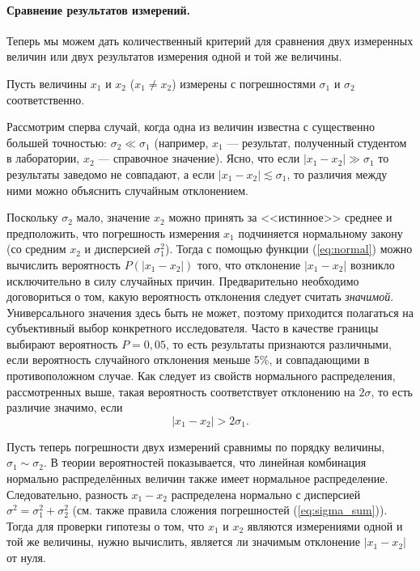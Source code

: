 \documentclass[10pt]{article}
\begin{document}
\paragraph{Сравнение результатов измерений.}

Теперь мы можем дать количественный критерий для сравнения двух измеренных
величин или двух результатов измерения одной и той же величины.

Пусть величины $x_{1}$ и $x_{2}$ ($x_{1}\ne x_{2}$) измерены с
погрешностями $\sigma_{1}$ и $\sigma_{2}$ соответственно. 

Рассмотрим сперва случай, когда одна из величин известна с существенно
большей точностью: $\sigma_{2}\ll\sigma_{1}$ (например, $x_{1}$
--- результат, полученный студентом в лаборатории, $x_{2}$
--- справочное значение). Ясно, что если $\left|x_{1}-x_{2}\right|\gg\sigma_{1}$
то результаты заведомо не совпадают, а если $\left|x_{1}-x_{2}\right|\lesssim\sigma_{1}$,
то различия между ними можно объяснить случайным отклонением.

Поскольку $\sigma_{2}$ мало, значение $x_{2}$ можно принять за <<истинное>>
среднее и предположить, что погрешность измерения $x_{1}$ подчиняется
нормальному закону (со средним $x_{2}$ и дисперсией $\sigma_{1}^{2}$).
Тогда с помощью функции (\ref{eq:normal}) можно вычислить вероятность
$P\left(\left|x_{1}-x_{2}\right|\right)$ того, что отклонение $\left|x_{1}-x_{2}\right|$
возникло исключительно в силу случайных причин. Предварительно необходимо
договориться о том, какую вероятность отклонения следует считать \emph{значимой}.
Универсального значения здесь быть не может, поэтому приходится полагаться
на субъективный выбор конкретного исследователя. Часто в качестве
границы выбирают вероятность $P=0{,}05$, то есть результаты признаются
различными, если вероятность случайного отклонения меньше 5\%, и совпадающими
в противоположном случае. Как следует из свойств нормального распределения,
рассмотренных выше, такая вероятность соответствует отклонению на
$2\sigma$, то есть различие значимо, если 
\[
\left|x_{1}-x_{2}\right|>2\sigma_{1}.
\]

Пусть теперь погрешности двух измерений сравнимы по порядку величины,
$\sigma_{1}\sim\sigma_{2}$. В теории вероятностей показывается, что
линейная комбинация нормально распределённых величин также имеет нормальное
распределение. Следовательно, разность $x_{1}-x_{2}$ распределена
нормально с дисперсией $\sigma^{2}=\sigma_{1}^{2}+\sigma_{2}^{2}$
(см. также правила сложения погрешностей (\ref{eq:sigma_sum})). Тогда
для проверки гипотезы о том, что $x_{1}$ и $x_{2}$ являются измерениями
одной и той же величины, нужно вычислить, является ли значимым отклонение
$\left|x_{1}-x_{2}\right|$ от нуля.
\end{document}
